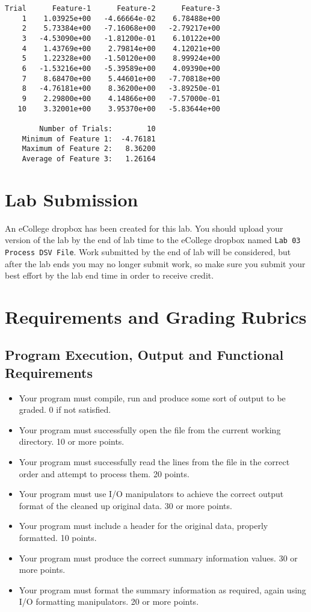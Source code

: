 \documentclass[11pt]{article}
\begin{document}
\begin{verbatim}
Trial      Feature-1      Feature-2      Feature-3
    1    1.03925e+00   -4.66664e-02    6.78488e+00
    2    5.73384e+00   -7.16068e+00   -2.79217e+00
    3   -4.53090e+00   -1.81200e-01    6.10122e+00
    4    1.43769e+00    2.79814e+00    4.12021e+00
    5    1.22328e+00   -1.50120e+00    8.99924e+00
    6   -1.53216e+00   -5.39589e+00    4.09390e+00
    7    8.68470e+00    5.44601e+00   -7.70818e+00
    8   -4.76181e+00    8.36200e+00   -3.89250e-01
    9    2.29800e+00    4.14866e+00   -7.57000e-01
   10    3.32001e+00    3.95370e+00   -5.83644e+00

        Number of Trials:        10
    Minimum of Feature 1:  -4.76181
    Maximum of Feature 2:   8.36200
    Average of Feature 3:   1.26164
\end{verbatim}
\section*{Lab Submission}
\label{sec-4}


An eCollege dropbox has been created for this lab.  You should
upload your version of the lab by the end of lab time to the eCollege
dropbox named \verb~Lab 03 Process DSV File~.  Work submitted by the end
of lab will be considered, but after the lab ends you may no longer
submit work, so make sure you submit your best effort by the lab end
time in order to receive credit.
\section*{Requirements and Grading Rubrics}
\label{sec-5}
\subsection*{Program Execution, Output and Functional Requirements}
\label{sec-5-1}


\begin{itemize}
\item Your program must compile, run and produce some sort of output to be
  graded. 0 if not satisfied.
\item Your program must successfully open the file from the current
  working directory. 10 or more points.
\item Your program must successfully read the lines from the file in the
  correct order and attempt to process them. 20 points.
\item Your program must use I/O manipulators to achieve the correct output
  format of the cleaned up original data.  30 or more points.
\item Your program must include a header for the original data, properly
  formatted. 10 points.
\item Your program must produce the correct summary information values. 30
  or more points.
\item Your program must format the summary information as required, again
  using I/O formatting manipulators.  20 or more points.
\end{itemize}
\end{document}
